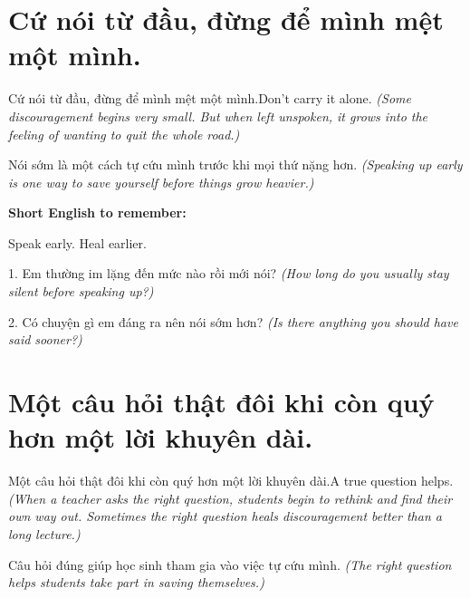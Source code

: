 \section{Cứ nói từ đầu, đừng để mình mệt một mình.}
\begin{truyen}{Cứ nói từ đầu, đừng để mình mệt một mình.}{Don't carry it alone.}
\textit{(Some discouragement begins very small. But when left unspoken, it grows into the feeling of wanting to quit the whole road.)}
\end{truyen}

\begin{baihoc}
Nói sớm là một cách tự cứu mình trước khi mọi thứ nặng hơn.
\textit{(Speaking up early is one way to save yourself before things grow heavier.)}
\end{baihoc}

\begin{ghinhoanh}
\textbf{Short English to remember:}

Speak early. Heal earlier.

\end{ghinhoanh}

\begin{tuhocnhanh}
1. Em thường im lặng đến mức nào rồi mới nói? \textit{(How long do you usually stay silent before speaking up?)}

2. Có chuyện gì em đáng ra nên nói sớm hơn? \textit{(Is there anything you should have said sooner?)}
\end{tuhocnhanh}
\ngancach


\section{Một câu hỏi thật đôi khi còn quý hơn một lời khuyên dài.}
\begin{truyen}{Một câu hỏi thật đôi khi còn quý hơn một lời khuyên dài.}{A true question helps.}
\textit{(When a teacher asks the right question, students begin to rethink and find their own way out. Sometimes the right question heals discouragement better than a long lecture.)}
\end{truyen}

\begin{baihoc}
Câu hỏi đúng giúp học sinh tham gia vào việc tự cứu mình.
\textit{(The right question helps students take part in saving themselves.)}
\end{baihoc}

